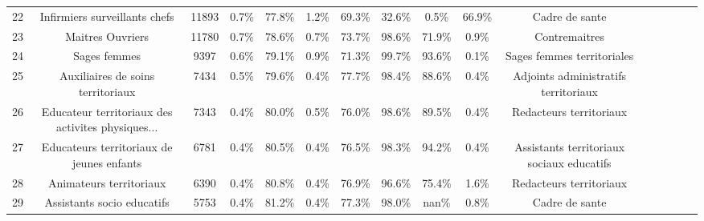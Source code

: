 \documentclass[10pt]{article}
\begin{document}
\begin{landscape}
\begin{longtable}{ | p{0.5cm} |*{15}{c|} }
22  &                      Infirmiers surveillants chefs &          11893 &           0.7\% &                  77.8\% &                 1.2\% &                    69.3\% &              32.6\% &                              0.5\% &                                    66.9\% &                                     Cadre de sante \\
23  &                                   Maitres Ouvriers &          11780 &           0.7\% &                  78.6\% &                 0.7\% &                    73.7\% &              98.6\% &                             71.9\% &                                     0.9\% &                                      Contremaitres \\
24  &                                       Sages femmes &           9397 &           0.6\% &                  79.1\% &                 0.9\% &                    71.3\% &              99.7\% &                             93.6\% &                                     0.1\% &                         Sages femmes territoriales \\
25  &                  Auxiliaires de soins territoriaux &           7434 &           0.5\% &                  79.6\% &                 0.4\% &                    77.7\% &              98.4\% &                             88.6\% &                                     0.4\% &               Adjoints administratifs territoriaux \\
26  &  Educateur territoriaux des activites physiques... &           7343 &           0.4\% &                  80.0\% &                 0.5\% &                    76.0\% &              98.6\% &                             89.5\% &                                     0.4\% &                            Redacteurs territoriaux \\
27  &          Educateurs territoriaux de jeunes enfants &           6781 &           0.4\% &                  80.5\% &                 0.4\% &                    76.5\% &              98.3\% &                             94.2\% &                                     0.4\% &          Assistants territoriaux sociaux educatifs \\
28  &                            Animateurs territoriaux &           6390 &           0.4\% &                  80.8\% &                 0.4\% &                    76.9\% &              96.6\% &                             75.4\% &                                     1.6\% &                            Redacteurs territoriaux \\
29  &                         Assistants socio educatifs &           5753 &           0.4\% &                  81.2\% &                 0.4\% &                    77.3\% &              98.0\% &                              nan\% &                                     0.8\% &                                     Cadre de sante \\

\end{longtable}
\end{landscape}
\end{document}
